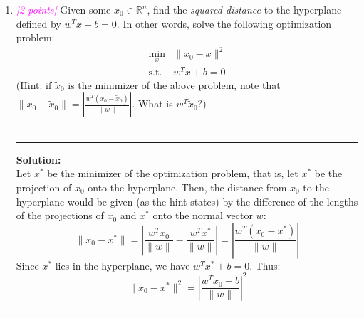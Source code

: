 \documentclass{article}
\newcommand{\field}[1]{\mathbb{#1}}
\newcommand{\1}{\mathbf{1}}
\newcommand{\R}{\field{R}} %
\newcommand{\points}[1]{\small\textcolor{magenta}{\emph{[#1 points]}} \normalsize}
\begin{document}
\begin{enumerate}
	\item \points{2} Given some $x_0 \in \R^n$, find the \emph{squared distance} to the hyperplane defined by $w^T x + b=0$.
	In other words, solve the following optimization problem:
	\begin{align*}
	\min_x& \|x_0 - x \|^2\\
	\text{s.t. }&w^Tx +b = 0
	\end{align*}
	(Hint: if $\widetilde{x}_0$ is the minimizer of the above problem, note that $\| x_0 - \widetilde{x}_0 \| = | \frac{w^T(x_0 - \widetilde{x}_0)}{\|w\|} |$. What is $w^T \widetilde{x}_0$?)\\
\\
    \noindent\rule{\textwidth}{1pt}
    {\bf Solution:}\\
    Let $x^*$ be the minimizer of the optimization problem, that is, let $x^*$ be the projection of $x_0$ onto the hyperplane. Then, the distance from $x_0$ to the hyperplane would be given (as the hint states) by the difference of the lengths of the projections of $x_0$ and $x^*$ onto the normal vector $w$:
    $$
    \|x_0 - x^*\| = \left| \frac{w^Tx_0}{\|w\|} - \frac{w^Tx^*}{\|w\|}\right| = \left|\frac{w^T(x_0 - x^*)}{\|w\|} \right|
    $$
    Since $x^*$ lies in the hyperplane, we have $w^Tx^* + b = 0$. Thus:
    $$
    \boxed{
    \|x_0 - x^*\|^2 = \left|\frac{w^Tx_0 + b}{\|w\|} \right|^2
    }
    $$
    \noindent\rule{\textwidth}{1pt}
    
\end{enumerate} 
\end{document}
